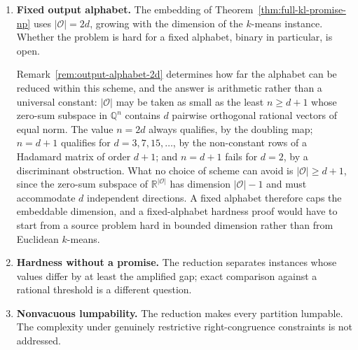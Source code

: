 \documentclass[12pt]{article}
\theoremstyle{definition}
\newcommand{\RetKL}{\Delta_{\mathrm{ret}}^{\mathrm{KL}}}
\begin{document}
\begin{enumerate}[leftmargin=2.0em]
\begin{enumerate}[label=(\alph*),leftmargin=2.0em]
Proposition~\ref{prop:full-kl-algebraic-form} locates the difficulty exactly.
For a fixed partition the whole sum collapses,
$\RetKL(\phi)=D^{-1}\log R$ with $D$ a positive integer and $R$ a positive
rational presented as a product of powers, so the comparison with $\tau$ is
equivalent to deciding $R\ge e^{D\tau}$.  The number of logarithmic terms is
therefore not the obstruction; the single rational-versus-exponential
comparison is.  That comparison is decidable, by
Lindemann--Weierstrass as recorded in
Remark~\ref{rem:full-kl-exp-membership}, and what is missing is a polynomial
bound on the precision needed to resolve it, equivalently a polynomial lower
bound on $|R-e^{D\tau}|$.  Remark~\ref{rem:full-kl-slp} shows that $R$ must be
kept in factored form for this to be a meaningful question, its expanded
numerator and denominator being of exponential bit size.  Consequently the
problem lies in NP as soon as this $\textsc{PosSLP}$-type comparison admits
polynomial-time verifiable certificates.
\item \textbf{Fixed output alphabet.}  The embedding of
Theorem~\ref{thm:full-kl-promise-np} uses $|\mathcal O|=2d$, growing with the
dimension of the $k$-means instance.  Whether the problem is hard for a fixed
alphabet, binary in particular, is open.

Remark~\ref{rem:output-alphabet-2d} determines how far the alphabet can be
reduced within this scheme, and the answer is arithmetic rather than a
universal constant: $|\mathcal O|$ may be taken as small as the least
$n\ge d+1$ whose zero-sum subspace in $\mathbb Q^{n}$ contains $d$ pairwise
orthogonal rational vectors of equal norm.  The value $n=2d$ always qualifies,
by the doubling map; $n=d+1$ qualifies for $d=3,7,15,\dots$, by the
non-constant rows of a Hadamard matrix of order $d+1$; and $n=d+1$ fails for
$d=2$, by a discriminant obstruction.  What no choice of scheme can avoid is
$|\mathcal O|\ge d+1$, since the zero-sum subspace of
$\mathbb R^{|\mathcal O|}$ has dimension $|\mathcal O|-1$ and must accommodate
$d$ independent directions.  A fixed alphabet therefore caps the embeddable
dimension, and a fixed-alphabet hardness proof would have to start from a
source problem hard in bounded dimension rather than from Euclidean
$k$-means.
\item \textbf{Hardness without a promise.}  The reduction separates instances
whose values differ by at least the amplified gap; exact comparison against a
rational threshold is a different question.
\item \textbf{Nonvacuous lumpability.}  The reduction makes every partition
lumpable.  The complexity under genuinely restrictive right-congruence
constraints is not addressed.
\end{enumerate}


\end{enumerate}
\end{document}

